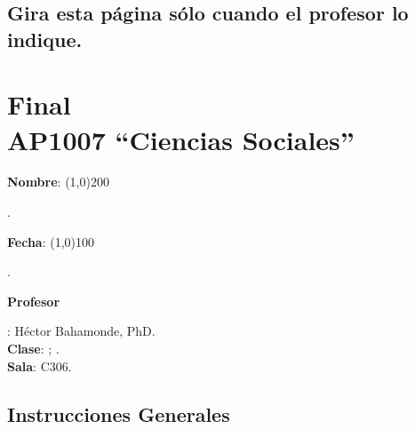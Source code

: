 \documentclass{article}
\begin{document}
\subsection*{Gira esta p\'agina s\'olo cuando el profesor lo indique.}

\clearpage
\newpage

{\centering\section*{Final\\AP1007 ``Ciencias Sociales''}}

{\vspace{.5cm}\raggedright{\bf Nombre}: \line(1,0){200}}. %
{\vspace{.5cm}\hspace{4.5cm}\raggedright{\bf Fecha}: \line(1,0){100}}. %


{\vspace{.5cm}\raggedright \bf Profesor}: H\'ector Bahamonde, PhD.\\
{\bf Clase}: {\unskip}; {\unskip}.\\
{\bf Sala}: C306.


\vspace{0.5cm}\subsection*{Instrucciones Generales}
\end{document}
